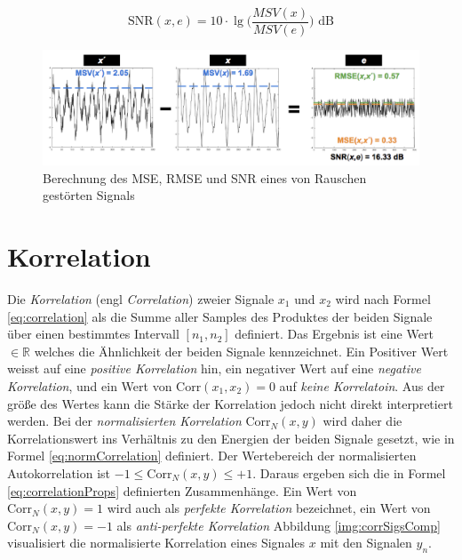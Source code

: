 \begin{equation}
\text{SNR}(x,e) = 10 \cdot  \lg \Big(\frac{MSV(x)}{MSV(e)} \Big) \text{ dB}
\label{eq:snrDb}
\end{equation}

\begin{figure}[h]
	\centering
	\includegraphics[width=1\textwidth]{bilder/snrStuff02.png}
	\caption{Berechnung des MSE, RMSE und SNR eines von Rauschen gestörten Signals}
	\label{img:snrStuff}
\end{figure}

\section{Korrelation}
\label{sec:correlation}

Die \emph{Korrelation} (engl \emph{Correlation}) zweier Signale $x_1$ und $x_2$ wird nach Formel \ref{eq:correlation} als die Summe aller Samples des Produktes der beiden Signale über einen bestimmtes Intervall $[n_1, n_2]$ definiert. Das Ergebnis ist eine Wert $\in \mathbb{R}$ welches die \glqq Ähnlichkeit der beiden Signale\grqq{} kennzeichnet. Ein Positiver Wert weisst auf eine \emph{positive Korrelation} hin, ein negativer Wert auf eine \emph{negative Korrelation}, und ein Wert von $\text{Corr}(x_1,x_2) = 0$ auf \emph{keine Korrelatoin}. Aus der größe des Wertes kann die Stärke der Korrelation jedoch nicht direkt interpretiert werden. Bei der \emph{normalisierten Korrelation} Corr$_N(x,y)$ wird daher die Korrelationswert ins Verhältnis zu den Energien der beiden Signale gesetzt, wie in Formel \ref{eq:normCorrelation} definiert. Der Wertebereich der normalisierten Autokorrelation  ist $-1 \leq \text{Corr}_N(x,y) \leq +1$. Daraus ergeben sich die in Formel \ref{eq:correlationProps} definierten Zusammenhänge. Ein Wert von $ \text{Corr}_N(x,y) = 1$ wird auch als \emph{perfekte Korrelation} bezeichnet, ein Wert von  $ \text{Corr}_N(x,y) = -1$ als \emph{anti-perfekte Korrelation} \cite[S. 46 - 47]{dspMichigan} Abbildung \ref{img:corrSigsComp} visualisiert die normalisierte Korrelation eines Signales $x$ mit den Signalen $y_n$.

